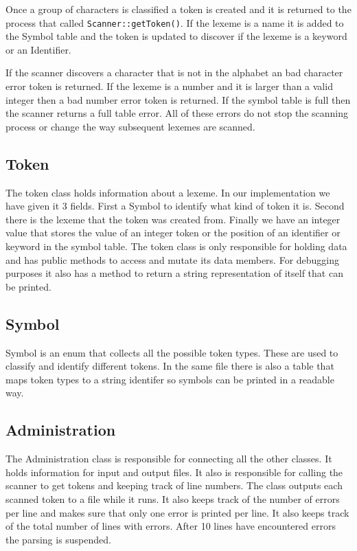 \documentclass{article}
\begin{document}
Once a group of characters is classified a token is created and it is returned
to the process that called \verb|Scanner::getToken()|. If the lexeme is a name
it is added to the Symbol table and the token is updated to discover if the
lexeme is a keyword or an Identifier.

If the scanner discovers a character that is not in the alphabet an bad character
error token is returned. If the lexeme is a number and it is larger than a
valid integer then a bad number error token is returned. If the symbol table
is full then the scanner returns a full table error. All of these errors do not
stop the scanning process or change the way subsequent lexemes are scanned.

\subsection{Token}
The token class holds information about a lexeme. In our implementation we have
given it 3 fields. First a Symbol to identify what kind of token it is. Second
there is the lexeme that the token was created from. Finally we have an integer
value that stores the value of an integer token or the position of an identifier
or keyword in the symbol table. The token class is only responsible for holding
data and has public methods to access and mutate its data members. For debugging
purposes it also has a method to return a string representation of itself that
can be printed.

\subsection{Symbol}
Symbol is an enum that collects all the possible token types. These are used to
classify and identify different tokens. In the same file there is also a table
that maps token types to a string identifer so symbols can be printed in a
readable way.

\subsection{Administration}
The Administration class is responsible for connecting all the other classes. It
holds information for input and output files. It also is responsible for calling
the scanner to get tokens and keeping track of line numbers. The class
outputs each scanned token to a file while it runs. It also keeps track
of the number of errors per line and makes sure that only one error is printed
per line. It also keeps track of the total number of lines with errors. After 10
lines have encountered errors the parsing is suspended.
\end{document}
